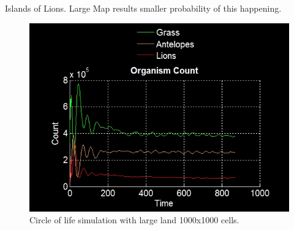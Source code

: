 \documentclass[11pt]{article}
\begin{document}
Islands of Lions. Large Map results smaller probability of this happening.

\begin{figure}
\centering
\includegraphics[scale=0.7]{circleOfLifeLargeLand}
\caption{Circle of life simulation with large land 1000x1000 cells.}
\label{fig:CircleOfLifeLarge}
\end{figure}
\end{document}
